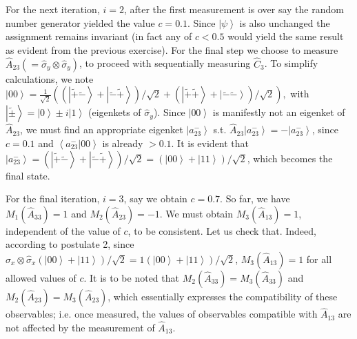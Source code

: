 \documentclass[british,aps,prl,superscriptaddress,nofootinbib,times,reprint]{revtex4-1}
\theoremstyle{plain}
\theoremstyle{plain}
\theoremstyle{definition}
\theoremstyle{remark}
\theoremstyle{remark}
\theoremstyle{remark}
\theoremstyle{plain}
\theoremstyle{plain}
\theoremstyle{plain}
\theoremstyle{definition}
\theoremstyle{definition}
\begin{document}
For the next iteration, $i=2$, 
after the first measurement is over
say the random number generator yielded the value $c=0.1$.
Since $\left|\psi\right\rangle $ is also
unchanged
the assignment remains invariant (in fact any of
$c<0.5$ would yield the same result as
evident from the previous exercise). For the
final step we choose to measure
$\hat{A}_{23}(=\hat{\sigma}_{y}\otimes\hat{\sigma}_{y})$,
to proceed with sequentially measuring
$\hat{C}_{3}$. To simplify calculations, we note
$\left|00\right\rangle
=\frac{1}{\sqrt 2} \left( (\left|\tilde{+}\tilde{-}\right\rangle
+\left|\tilde{-}\tilde{+}\right\rangle
)/\sqrt{2}+(\left|\tilde{+}\tilde{+}\right\rangle
+\left|\tilde{-}\tilde{-}\right\rangle
)/\sqrt{2}\right) , 
$
with
$\left|\tilde{\pm}\right\rangle
=\left|0\right\rangle \pm i\left|1\right\rangle $
(eigenkets of $\hat{\sigma}_{y}$). Since
$\left|00\right\rangle$ is manifestly not an
eigenket of $\hat A_{23}$, we must find an appropriate
eigenket $\left|a^-_{23}\right\rangle $ s.t.
$\hat A_{23}\left|a^{-}_{23}\right\rangle
=-\left|a^{-}_{23}\right\rangle $, since $c=0.1$ and
$\left\langle a_{23}^{-}|00\right\rangle $ is already
$>0.1$. It is evident that
$\left|a^{-}_{23}\right\rangle
=\left(\left|\tilde{+}\tilde{-}\right\rangle
+\left|\tilde{-}\tilde{+}\right\rangle
\right)/\sqrt{2}=\left(\left|00\right\rangle
+\left|11\right\rangle \right)/\sqrt{2}$, which
becomes the final state. 


For the final
iteration, $i=3$, say we obtain $c=0.7$. So far,
we have $M_{1}(\hat{A}_{33})=1$ and
$M_{2}(\hat{A}_{23})=-1$. We must obtain
$M_{3}(\hat{A}_{13})=1$, independent of the value
of $c$, to be consistent. Let us check that.
Indeed, according to postulate 2, since
$\hat{\sigma}_{x}\otimes\hat{\sigma}_{x}\left(\left|00\right\rangle
+\left|11\right\rangle
\right)/\sqrt{2}=1\left(\left|00\right\rangle
+\left|11\right\rangle \right)/\sqrt{2}$,
$M_{3}(\hat{A}_{13})=1$ for all allowed values of
$c$. It is to be noted that
$M_{2}(\hat{A}_{33})=M_{3}(\hat{A}_{33})$ and
$M_{2}(\hat{A}_{23})=M_{3}(\hat{A}_{23})$, which
essentially expresses the compatibility of these
observables; i.e. 
once measured, the values of observables compatible
with $\hat{A}_{13}$ are not affected by the 
measurement of $\hat{A}_{13}$.
\end{document}
